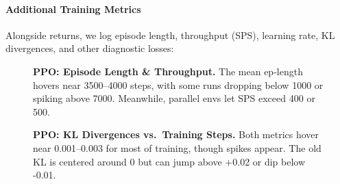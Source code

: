 \paragraph{Additional Training Metrics}
Alongside returns, we log episode length, throughput (SPS), learning rate, KL divergences, and other diagnostic losses:

\begin{figure} 
	\centering
	\quad
	\caption{\textbf{PPO: Episode Length \& Throughput.}
		The mean ep‐length hovers near 3500--4000 steps, 
		with some runs dropping below 1000 or spiking above 7000. 
		Meanwhile, parallel envs let SPS exceed 400 or 500.}
	\label{fig:ppo_epilen_sps}
\end{figure}

\begin{figure} 
	\centering
	\quad
	\caption{\textbf{PPO: KL Divergences vs.\ Training Steps.}
		Both metrics hover near 0.001--0.003 for most of training, 
		though spikes appear. The old KL is centered around 0 but can jump above +0.02 or dip below -0.01.}
	\label{fig:ppo_bothkl}
\end{figure}

